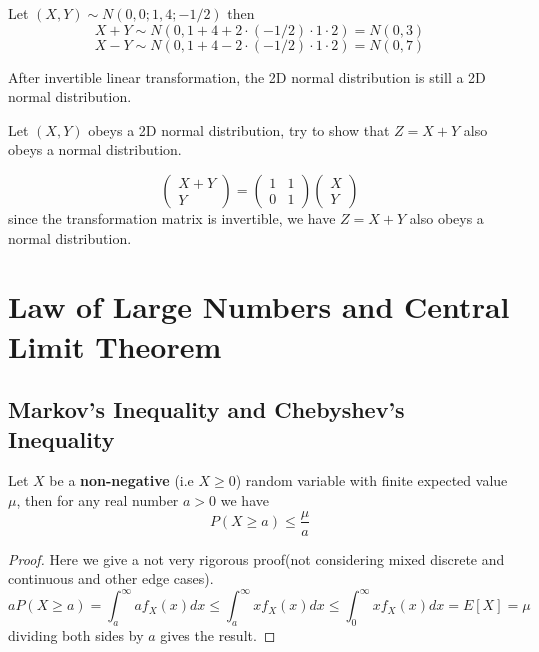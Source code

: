 \documentclass{template}
\begin{document}
\begin{example}
	Let $(X, Y) \sim N(0, 0; 1, 4; -1/2)$
	then
	\[
	X+Y \sim N(0, 1 + 4 + 2\cdot(-1/2)\cdot 1 \cdot 2) = N(0, 3)
	\] 
	\[
	X-Y \sim N(0, 1 + 4 - 2\cdot(-1/2)\cdot 1 \cdot 2) = N(0, 7)
	\] 
	
\end{example}

\begin{theorem}
	After invertible linear transformation, the 2D normal distribution is still a 2D normal distribution.
\end{theorem}

\begin{example}
	Let $(X, Y)$ obeys a 2D normal distribution, try to show that $Z = X+Y$ also obeys a normal distribution.
	\begin{answer}
		\[
		\begin{pmatrix}
			X+Y \\ Y
		\end{pmatrix} =
		\begin{pmatrix}
			1 & 1 \\ 0 & 1
		\end{pmatrix}
		\begin{pmatrix}
			X \\ Y
		\end{pmatrix}
		\] 
		since the transformation matrix is invertible, we have $Z = X+Y$ also obeys a normal distribution.
	\end{answer}
\end{example}

\section{Law of Large Numbers and Central Limit Theorem}

\subsection{Markov's Inequality and Chebyshev's Inequality}
\begin{lemma}
	Let $X$ be a \textbf{non-negative} (i.e $X \geq 0$) random variable with finite expected value $\mu$, then
	for any real number $a > 0$ we have
	\[
		P(X \geq a) \leq \frac{\mu}{a}
	\]
	\begin{proof}
		Here we give a not very rigorous proof(not considering mixed discrete and continuous and other edge cases).
		\[
			a P(X \geq a) = \int_a^{\infty} a f_X(x) dx \leq \int_a^{\infty} x f_X(x) dx
			\leq \int_0^{\infty} x f_X(x) dx = E[X] = \mu
		\]
		dividing both sides by $a$ gives the result.
	\end{proof}
\end{lemma}
\end{document}
